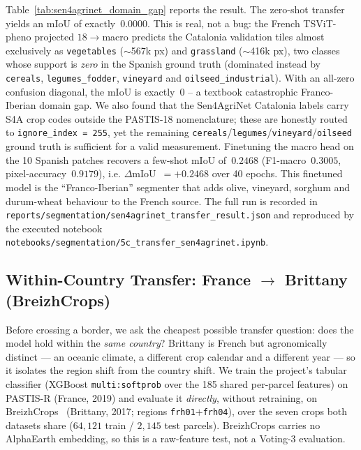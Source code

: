 Table~\ref{tab:sen4agrinet_domain_gap} reports the result. The zero-shot transfer yields
an mIoU of exactly~$0.0000$. This is real, not a bug: the French TSViT-pheno projected
$18\rightarrow$macro predicts the Catalonia validation tiles almost exclusively as
\texttt{vegetables} ($\sim$567k px) and \texttt{grassland} ($\sim$416k px), two classes
whose support is \emph{zero} in the Spanish ground truth (dominated instead by
\texttt{cereals}, \texttt{legumes\_fodder}, \texttt{vineyard} and
\texttt{oilseed\_industrial}). With an all-zero confusion diagonal, the mIoU is
exactly~0 -- a textbook catastrophic Franco-Iberian domain gap. We also found that the
Sen4AgriNet Catalonia labels carry S4A crop codes outside the PASTIS-18 nomenclature;
these are honestly routed to \texttt{ignore\_index = 255}, yet the remaining
\texttt{cereals}/\texttt{legumes}/\texttt{vineyard}/\texttt{oilseed} ground truth is
sufficient for a valid measurement. Finetuning the macro head on the 10 Spanish patches
recovers a few-shot mIoU of~$0.2468$ (F1-macro~$0.3005$, pixel-accuracy~$0.9179$), i.e.
$\Delta$mIoU~$= +0.2468$ over 40 epochs. This finetuned model is the
``Franco-Iberian'' segmenter that adds olive, vineyard, sorghum and durum-wheat behaviour
to the French source. The full run is recorded in
\texttt{reports/segmentation/sen4agrinet\_transfer\_result.json} and reproduced by the
executed notebook \texttt{notebooks/segmentation/5c\_transfer\_sen4agrinet.ipynb}.



\subsection{Within-Country Transfer: France $\rightarrow$ Brittany (BreizhCrops)}
\label{sec:multiregion:breizhcrops}

Before crossing a border, we ask the cheapest possible transfer question: does the model
hold within the \emph{same country}? Brittany is French but agronomically distinct --- an
oceanic climate, a different crop calendar and a different year --- so it isolates the
region shift from the country shift. We train the project's tabular classifier (XGBoost
\texttt{multi:softprob} over the 185 shared per-parcel features) on PASTIS-R (France, 2019)
and evaluate it \emph{directly}, without retraining, on BreizhCrops~\cite{russwurm2020breizhcrops} (Brittany, 2017; regions \texttt{frh01}$+$\texttt{frh04}),
over the seven crops both datasets share ($64{,}121$ train / $2{,}145$ test parcels).
BreizhCrops carries no AlphaEarth embedding, so this is a raw-feature test, not a
Voting-3 evaluation.

